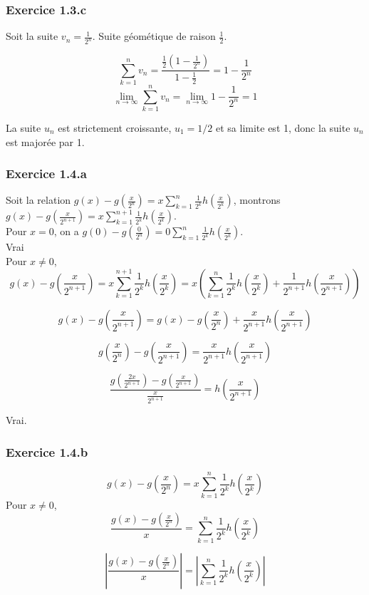 \documentclass[]{book}
\theoremstyle{definition}
\begin{document}
\subsubsection*{Exercice 1.3.c}
Soit la suite $v_{n} = \frac{1}{2^n}$. Suite g\'eom\'etique de raison $\frac{1}{2}$.

$$\sum_{k=1}^{n} v_n = \frac{\frac{1}{2}(1-\frac{1}{2^n})}{1-\frac{1}{2}} = 1-\frac{1}{2^n}$$
$$\lim_{n \to \infty} \sum_{k=1}^{n} v_n = \lim_{n \to \infty} 1-\frac{1}{2^n} = 1$$

La suite $u_n$ est strictement croissante, $u_1=1/2$ et sa limite est 1, donc la suite $u_n$ est major\'ee par 1.


\subsubsection*{Exercice 1.4.a}
Soit la relation $g(x) - g(\frac{x}{2^n}) = x\sum_{k=1}^{n} {\frac{1}{2^k}h\left(\frac{x}{2^k}\right)}$, montrons $g(x) - g(\frac{x}{2^{n+1}}) = x\sum_{k=1}^{n+1} {\frac{1}{2^k}h\left(\frac{x}{2^k}\right)}$.\\
Pour $x=0$, on a $g(0)- g(\frac{0}{2^n}) = 0\sum_{k=1}^{n} {\frac{1}{2^k}h\left(\frac{x}{2^k}\right)}$.\\
Vrai\\

Pour $x \neq 0$,
$$g(x) - g(\frac{x}{2^{n+1}}) = x\sum_{k=1}^{n+1} {\frac{1}{2^k}h\left(\frac{x}{2^k}\right)} = x\left(\sum_{k=1}^{n} {\frac{1}{2^k}h\left(\frac{x}{2^k}\right)} + \frac{1}{2^{n+1}}h\left(\frac{x}{2^{n+1}}\right)\right)$$

$$g(x) - g(\frac{x}{2^{n+1}}) = g(x) - g(\frac{x}{2^{n}}) + \frac{x}{2^{n+1}}h\left(\frac{x}{2^{n+1}}\right)$$

$$ g(\frac{x}{2^{n}}) - g(\frac{x}{2^{n+1}}) = \frac{x}{2^{n+1}}h\left(\frac{x}{2^{n+1}}\right)$$

$$ \frac{g(\frac{2x}{2^{n+1}}) - g(\frac{x}{2^{n+1}})}{\frac{x}{2^{n+1}}} = h\left(\frac{x}{2^{n+1}}\right)$$

Vrai.

\subsubsection*{Exercice 1.4.b}
$$g(x) - g(\frac{x}{2^n}) = x\sum_{k=1}^{n} {\frac{1}{2^k}h\left(\frac{x}{2^k}\right)}$$
Pour $x \neq 0$, 
$$\frac{g(x) - g(\frac{x}{2^n})}{x} = \sum_{k=1}^{n} {\frac{1}{2^k}h\left(\frac{x}{2^k}\right)}$$

$$\left| \frac{g(x) - g(\frac{x}{2^n})}{x} \right| = \left| \sum_{k=1}^{n} {\frac{1}{2^k}h\left(\frac{x}{2^k}\right)} \right| $$
\end{document}
